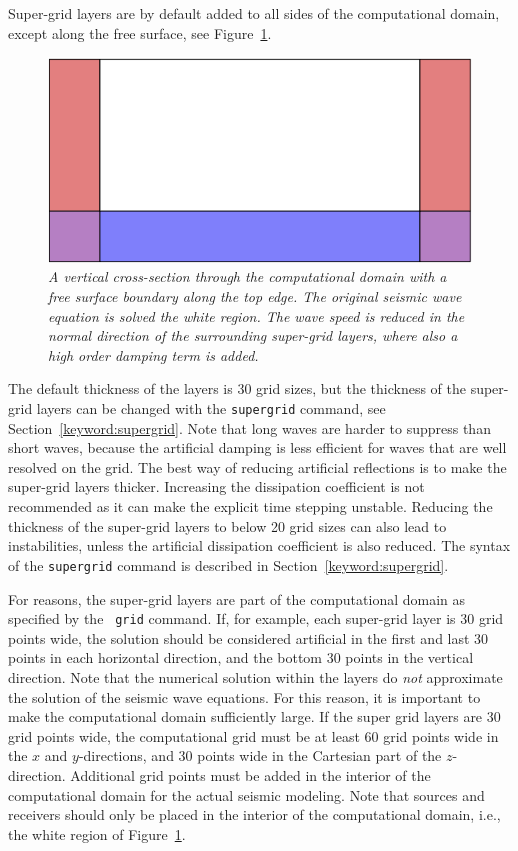 \documentclass[11pt]{report}
\begin{document}
Super-grid layers are by default added to all sides of the computational domain, except along the
free surface, see Figure~\ref{fig:layout}.
\begin{figure}[t]
\begin{center}
\includegraphics[width=0.65\linewidth]{figures/layout.png}
\caption{\em A vertical cross-section through the computational domain with a free surface boundary
  along the top edge. The original seismic wave equation is solved the white region. The wave speed
  is reduced in the normal direction of the surrounding super-grid layers, where also a high order
  damping term is added.}\label{fig:layout}
\end{center}
\end{figure}
The default thickness of the layers is 30 grid sizes, but the thickness of the super-grid layers can
be changed with the {\tt supergrid} command, see Section~\ref{keyword:supergrid}. Note that long
waves are harder to suppress than short waves, because the artificial damping is less efficient for
waves that are well resolved on the grid. The best way of reducing artificial reflections is to make
the super-grid layers thicker. Increasing the dissipation coefficient is not recommended as it can
make the explicit time stepping unstable. Reducing the thickness of the super-grid layers to below
20 grid sizes can also lead to instabilities, unless the artificial dissipation coefficient is also
reduced. The syntax of the {\tt supergrid} command is described in Section~\ref{keyword:supergrid}.

For reasons, the super-grid layers are part of the computational domain as specified by the {\tt
  grid} command. If, for example, each super-grid layer is 30 grid points wide, the solution should
be considered artificial in the first and last 30 points in each horizontal direction, and the
bottom 30 points in the vertical direction. Note that the numerical solution within the layers do
{\em not} approximate the solution of the seismic wave equations. For this reason, it is important
to make the computational domain sufficiently large. If the super grid layers are 30 grid points
wide, the computational grid must be at least 60 grid points wide in the $x$ and $y$-directions, and
30 points wide in the Cartesian part of the $z$-direction. Additional grid points must be added in
the interior of the computational domain for the actual seismic modeling. Note that sources and
receivers should only be placed in the interior of the computational domain, i.e., the white region
of Figure~\ref{fig:layout}.
\end{document}
